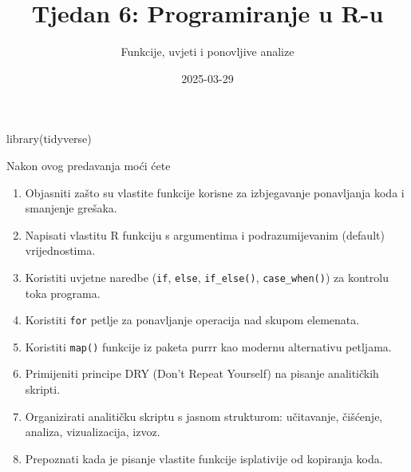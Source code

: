 \documentclass[
  croatian,
  letterpaper,
  DIV=11,
  numbers=noendperiod]{scrartcl}
\title{Tjedan 6: Programiranje u R-u}
\subtitle{Funkcije, uvjeti i ponovljive analize}
\author{}
\date{2025-03-29}
\newenvironment{Shaded}{\begin{snugshade}}{\end{snugshade}}
\newcommand{\FunctionTok}[1]{\textcolor[rgb]{0.28,0.35,0.67}{#1}}
\newcommand{\NormalTok}[1]{\textcolor[rgb]{0.00,0.23,0.31}{#1}}
\providecommand{\tightlist}{%
  \setlength{\itemsep}{0pt}\setlength{\parskip}{0pt}}
\renewcommand*\contentsname{Table of contents}
\newcommand\contentsname{Table of contents}
\begin{document}
\maketitle

\renewcommand*\contentsname{Table of contents}
{
\hypersetup{linkcolor=}
\setcounter{tocdepth}{3}
\tableofcontents
}

\begin{Shaded}
\begin{Highlighting}[]
\FunctionTok{library}\NormalTok{(tidyverse)}
\end{Highlighting}
\end{Shaded}

\begin{tcolorbox}[enhanced jigsaw, coltitle=black, arc=.35mm, colframe=quarto-callout-note-color-frame, left=2mm, bottomrule=.15mm, toprule=.15mm, leftrule=.75mm, bottomtitle=1mm, colback=white, title=\textcolor{quarto-callout-note-color}{\faInfo}\hspace{0.5em}{Ishodi učenja}, opacityback=0, colbacktitle=quarto-callout-note-color!10!white, toptitle=1mm, titlerule=0mm, opacitybacktitle=0.6, breakable, rightrule=.15mm]

Nakon ovog predavanja moći ćete

\begin{enumerate}
\def\labelenumi{\arabic{enumi}.}
\tightlist
\item
  Objasniti zašto su vlastite funkcije korisne za izbjegavanje
  ponavljanja koda i smanjenje grešaka.
\item
  Napisati vlastitu R funkciju s argumentima i podrazumijevanim
  (default) vrijednostima.
\item
  Koristiti uvjetne naredbe (\texttt{if}, \texttt{else},
  \texttt{if\_else()}, \texttt{case\_when()}) za kontrolu toka programa.
\item
  Koristiti \texttt{for} petlje za ponavljanje operacija nad skupom
  elemenata.
\item
  Koristiti \texttt{map()} funkcije iz paketa purrr kao modernu
  alternativu petljama.
\item
  Primijeniti principe DRY (Don't Repeat Yourself) na pisanje
  analitičkih skripti.
\item
  Organizirati analitičku skriptu s jasnom strukturom: učitavanje,
  čišćenje, analiza, vizualizacija, izvoz.
\item
  Prepoznati kada je pisanje vlastite funkcije isplativije od kopiranja
  koda.
\end{enumerate}

\end{tcolorbox}
\end{document}
